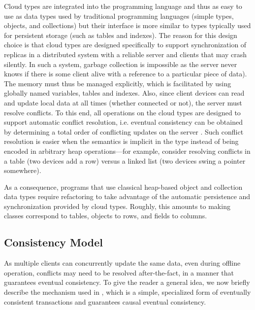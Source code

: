 \documentclass[preprint]{sigplanconf}
\begin{document}
Cloud types are integrated into the programming language and thus as easy to
use as data types used by traditional programming languages (simple types,
objects, and collections) but their interface is more similar to types
typically used for persistent storage (such as tables and
indexes).
The reason for this design choice is that cloud types are designed specifically to
support synchronization of replicas in a distributed system with a reliable
server and clients that may crash silently. 
In such a system, garbage collection is impossible as the server never knows if
there is some client alive with a reference to a particular piece of data).
The memory must thus be managed explicitly, which is
facilitated by using globally named variables, tables and indexes. 
Also, since client devices can read and update local data at all times (whether
connected or not), the server must resolve conflicts.
To this end, all operations on the
cloud types are designed to support automatic conflict resolution, i.e.
eventual consistency can be obtained by determining a total order of
conflicting updates on the server
\cite{burckhardt2012cloud,terry-et-al-SIGOPS95}. 
Such conflict resolution is easier when the semantics is implicit in the type
instead of being encoded in arbitrary heap operations---for example, consider
resolving conflicts in a table (two devices add a row) versus a linked list
(two devices swing a pointer somewhere).

As a consequence, programs that use
classical heap-based object and collection data types require refactoring to
take advantage of the automatic persistence and synchronization provided by
cloud types. Roughly, this amounts to making classes correspond to tables,
objects to rows, and fields to columns. 

\subsection{Consistency Model}

As multiple clients can concurrently update the same data, even during offline operation, conflicts may need to be resolved after-the-fact, in a manner that guarantees eventual consistency. To give the reader a general idea, we now briefly describe the mechanism used in \TD, which is a simple, specialized form of eventually consistent transactions \cite{burckhardt2012ect} and guarantees causal eventual consistency. 
\end{document}
